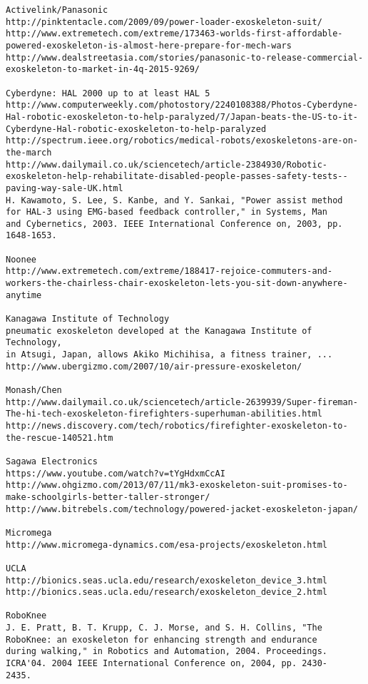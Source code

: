\documentclass[letterpaper,12pt,fullpage]{article}
\begin{document}
\begin{verbatim}
Activelink/Panasonic
http://pinktentacle.com/2009/09/power-loader-exoskeleton-suit/
http://www.extremetech.com/extreme/173463-worlds-first-affordable-powered-exoskeleton-is-almost-here-prepare-for-mech-wars
http://www.dealstreetasia.com/stories/panasonic-to-release-commercial-exoskeleton-to-market-in-4q-2015-9269/

Cyberdyne: HAL 2000 up to at least HAL 5
http://www.computerweekly.com/photostory/2240108388/Photos-Cyberdyne-Hal-robotic-exoskeleton-to-help-paralyzed/7/Japan-beats-the-US-to-it-Cyberdyne-Hal-robotic-exoskeleton-to-help-paralyzed
http://spectrum.ieee.org/robotics/medical-robots/exoskeletons-are-on-the-march
http://www.dailymail.co.uk/sciencetech/article-2384930/Robotic-exoskeleton-help-rehabilitate-disabled-people-passes-safety-tests--paving-way-sale-UK.html
H. Kawamoto, S. Lee, S. Kanbe, and Y. Sankai, "Power assist method
for HAL-3 using EMG-based feedback controller," in Systems, Man
and Cybernetics, 2003. IEEE International Conference on, 2003, pp.
1648-1653.

Noonee
http://www.extremetech.com/extreme/188417-rejoice-commuters-and-workers-the-chairless-chair-exoskeleton-lets-you-sit-down-anywhere-anytime

Kanagawa Institute of Technology
pneumatic exoskeleton developed at the Kanagawa Institute of Technology,
in Atsugi, Japan, allows Akiko Michihisa, a fitness trainer, ...
http://www.ubergizmo.com/2007/10/air-pressure-exoskeleton/

Monash/Chen
http://www.dailymail.co.uk/sciencetech/article-2639939/Super-fireman-The-hi-tech-exoskeleton-firefighters-superhuman-abilities.html
http://news.discovery.com/tech/robotics/firefighter-exoskeleton-to-the-rescue-140521.htm

Sagawa Electronics
https://www.youtube.com/watch?v=tYgHdxmCcAI
http://www.ohgizmo.com/2013/07/11/mk3-exoskeleton-suit-promises-to-make-schoolgirls-better-taller-stronger/
http://www.bitrebels.com/technology/powered-jacket-exoskeleton-japan/

Micromega
http://www.micromega-dynamics.com/esa-projects/exoskeleton.html

UCLA
http://bionics.seas.ucla.edu/research/exoskeleton_device_3.html
http://bionics.seas.ucla.edu/research/exoskeleton_device_2.html

RoboKnee
J. E. Pratt, B. T. Krupp, C. J. Morse, and S. H. Collins, "The
RoboKnee: an exoskeleton for enhancing strength and endurance
during walking," in Robotics and Automation, 2004. Proceedings.
ICRA'04. 2004 IEEE International Conference on, 2004, pp. 2430-
2435.


\end{verbatim}
\end{document}

